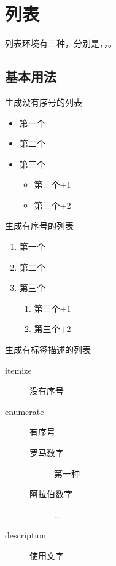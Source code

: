 \section{列表}\label{sec:列表}
    列表环境有三种，分别是，，。
    \subsection{基本用法}
    生成没有序号的列表
    
    \begin{texshow}
        \begin{itemize}
            \item 第一个
            \item 第二个
            \item 第三个
            \begin{itemize}
                \item 第三个+1
                \item 第三个+2
            \end{itemize}
        \end{itemize}
    \end{texshow}
    
    生成有序号的列表
    \begin{texshow}
        \begin{enumerate}
            \item 第一个
            \item 第二个
            \item 第三个
            \begin{enumerate}
                \item 第三个+1
                \item 第三个+2
            \end{enumerate}
        \end{enumerate}
    \end{texshow}
    生成有标签描述的列表
    \begin{texshow}
        \begin{description}
            \item[itemize] 没有序号
            \item[enumerate] 有序号
            \begin{description}
                \item[罗马数字] 第一种
                \item[阿拉伯数字] ...
            \end{description}
            \item[description] 使用文字
        \end{description}
    \end{texshow}

